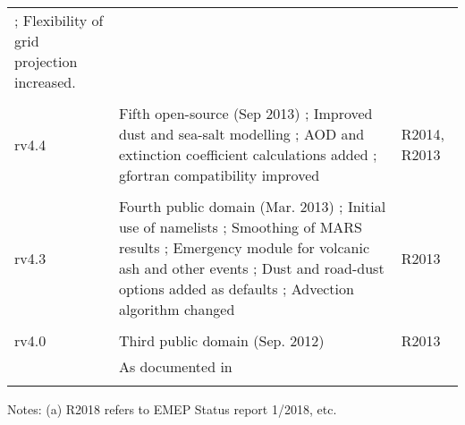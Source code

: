 \begin{table}
\begin{footnotesize}
\begin{tabular}{lp{11cm}l}
       ; Flexibility of grid projection increased. & \\
       &                                                &\\
rv4.4   & Fifth open-source (Sep 2013) %
       ; Improved dust and sea-salt modelling   %
       ; AOD and extinction coefficient calculations added %
       ; gfortran compatibility improved            %
                  & R2014, R2013\\
       &                                                &\\
rv4.3   & Fourth public domain (Mar. 2013)  %
       ; Initial use of namelists           %
       ; Smoothing of MARS results         %
       ; Emergency module for volcanic ash and other events%
       ; Dust and road-dust options added as defaults %
       ; Advection algorithm changed  %
             & R2013\\ 
        &                                                &\\
rv4.0   & Third public domain (Sep. 2012)                & R2013\\ 
        & As documented in \citet{Simpson_et_al:EMEP}    & \\
        &                                                &\\
\hline
\end{tabular}
Notes: (a) R2018 refers to EMEP Status report 1/2018, etc.
\end{footnotesize}
\end{table}

\clearpage
\renewcommand\bibname{References}      %

%
